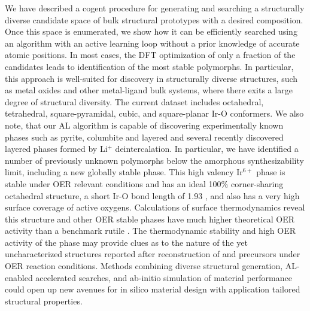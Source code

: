 %
%


%
We have described a cogent procedure for generating and searching a structurally diverse candidate space of bulk structural prototypes with a desired composition.
%
Once this space is enumerated, we show how it can be efficiently searched using an algorithm with an active learning loop without a prior knowledge of accurate atomic positions.
%
In most cases, the DFT optimization of only a fraction of the candidates leads to identification of the most stable polymorphs.
%
In particular, this approach is well-suited for discovery in structurally diverse structures, such as metal oxides and other metal-ligand bulk systems, where there exits a large degree of structural diversity.
%
The current dataset includes octahedral, tetrahedral, square-pyramidal, cubic, and square-planar Ir-O conformers.
%
We also note, that our AL algorithm is capable of discovering experimentally known phases such as pyrite, columbite and layered \IrOtwo and several recently discovered layered \IrOthree phases formed by Li$^+$ deintercalation.
%
In particular, we have identified a number of previously unknown \IrOthree polymorphs below the amorphous synthesizability limit,
including a new globally stable \aIrOthree phase.
%
This high valency Ir$^{6+}$ phase is stable under OER relevant conditions and has an ideal 100\% corner-sharing octahedral structure, a short Ir-O bond length of 1.93 \angstrom, and also has a very high surface coverage of active oxygens.
%
Calculations of surface thermodynamics reveal this structure and other OER stable \IrOthree phases have much higher theoretical OER activity than a benchmark rutile \IrOtwo.
%
The thermodynamic stability and high OER activity of the \aIrOthree phase may provide clues as to the nature of the yet uncharacterized structures reported after reconstruction of  and \IrOx precursors under OER reaction conditions.
%
Methods combining diverse structural generation, AL-enabled accelerated searches, and \mbox{ab-initio} simulation of material performance could open up new avenues for in silico material design with application tailored structural properties.
